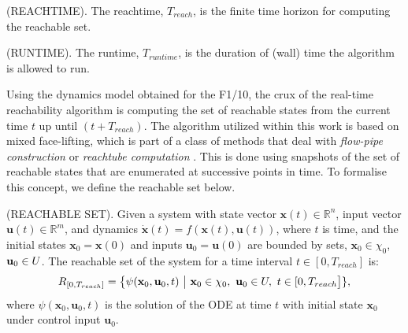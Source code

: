 \documentclass[manuscript,screen,review]{acmart}
\begin{document}
\begin{definition}%
(REACHTIME). The reachtime, $T_{reach}$, is the finite time horizon for computing the reachable set.
\end{definition}%
\begin{definition}%
(RUNTIME). The runtime, $T_{runtime}$, is the duration of (wall) time the algorithm is allowed to run.
\end{definition}%
 Using the dynamics model obtained for the F1/10, the crux of the real-time reachability algorithm is computing the set of reachable states from the current time $t$ up until $(t+T_{reach})$. The algorithm utilized within this work is based on mixed face-lifting, which is part of a class of methods that deal with \textit{flow-pipe construction} or \textit{reachtube computation} \cite{Johnson2016}. This is done using snapshots of the set of reachable states that are enumerated at successive points in time. To formalise this concept, we define the reachable set below.
\smallskip
\begin{definition}%
(REACHABLE SET). Given a system with state vector $\textbf{x}(t) \in \mathbb{R}^n$, input vector $\textbf{u}(t) \in \mathbb{R}^m$, and dynamics $\dot{\textbf{x}}(t)=f(\textbf{x}(t),\textbf{u}(t))$, where $t$ is time, and the initial states $\textbf{x}_0 = \textbf{x}(0)$ and inputs $\textbf{u}_0 = \textbf{u}(0)$ are bounded by sets, $\textbf{x}_0 \in \chi_0$, $\textbf{u}_0 \in \mathnormal{U}$. The reachable set of the system for a time interval $ t \in [0,T_{reach}]$ is:%
%
\begin{equation*}%
    \mathnormal{R}_{[0,T_{reach}]} = \big \{ \psi(\textbf{x}_0,\textbf{u}_0,t) \ \big| \ \textbf{x}_0 \in \chi_0, \ \textbf{u}_0 \in \mathnormal{U}, \ t \in [0,T_{reach}\big]\},%
\end{equation*}%
%
\noindent where $\psi(\textbf{x}_0,\textbf{u}_0,t)$ is the solution of the ODE at time $t$ with initial state $\textbf{x}_0$ under control input $\textbf{u}_0$.
\end{definition}%
\smallskip
\end{document}
